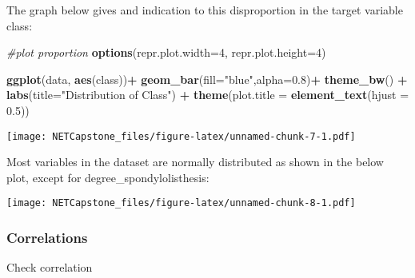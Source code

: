 \documentclass[
]{article}
\newenvironment{Shaded}{\begin{snugshade}}{\end{snugshade}}
\newcommand{\CommentTok}[1]{\textcolor[rgb]{0.56,0.35,0.01}{\textit{#1}}}
\newcommand{\DataTypeTok}[1]{\textcolor[rgb]{0.13,0.29,0.53}{#1}}
\newcommand{\DecValTok}[1]{\textcolor[rgb]{0.00,0.00,0.81}{#1}}
\newcommand{\FloatTok}[1]{\textcolor[rgb]{0.00,0.00,0.81}{#1}}
\newcommand{\KeywordTok}[1]{\textcolor[rgb]{0.13,0.29,0.53}{\textbf{#1}}}
\newcommand{\NormalTok}[1]{#1}
\newcommand{\OperatorTok}[1]{\textcolor[rgb]{0.81,0.36,0.00}{\textbf{#1}}}
\newcommand{\StringTok}[1]{\textcolor[rgb]{0.31,0.60,0.02}{#1}}
\begin{document}
The graph below gives and indication to this disproportion in the target
variable class:

\begin{Shaded}
\begin{Highlighting}[]
\CommentTok{#plot proportion}
\KeywordTok{options}\NormalTok{(}\DataTypeTok{repr.plot.width=}\DecValTok{4}\NormalTok{, }\DataTypeTok{repr.plot.height=}\DecValTok{4}\NormalTok{)}

\KeywordTok{ggplot}\NormalTok{(data, }\KeywordTok{aes}\NormalTok{(class))}\OperatorTok{+}
\StringTok{  }\KeywordTok{geom_bar}\NormalTok{(}\DataTypeTok{fill=}\StringTok{"blue"}\NormalTok{,}\DataTypeTok{alpha=}\FloatTok{0.8}\NormalTok{)}\OperatorTok{+}
\StringTok{  }\KeywordTok{theme_bw}\NormalTok{() }\OperatorTok{+}
\StringTok{  }\KeywordTok{labs}\NormalTok{(}\DataTypeTok{title=}\StringTok{"Distribution of Class"}\NormalTok{) }\OperatorTok{+}
\StringTok{  }\KeywordTok{theme}\NormalTok{(}\DataTypeTok{plot.title =} \KeywordTok{element_text}\NormalTok{(}\DataTypeTok{hjust =} \FloatTok{0.5}\NormalTok{))}
\end{Highlighting}
\end{Shaded}

\texttt{[image: NETCapstone\_files/figure-latex/unnamed-chunk-7-1.pdf]}

Most variables in the dataset are normally distributed as shown in the
below plot, except for degree\_spondylolisthesis:

\texttt{[image: NETCapstone\_files/figure-latex/unnamed-chunk-8-1.pdf]}

\hypertarget{correlations}{%
\subsubsection{Correlations}\label{correlations}}

Check correlation

\begin{Shaded}
\end{Shaded}
\end{document}
